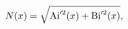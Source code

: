 \[\mathop{N\/}\nolimits\!\left(x\right)=\sqrt{{\mathop{\mathrm{Ai}\/}\nolimits'^%
{2}}\!\left(x\right)+{\mathop{\mathrm{Bi}\/}\nolimits'^{2}}\!\left(x\right)},\]